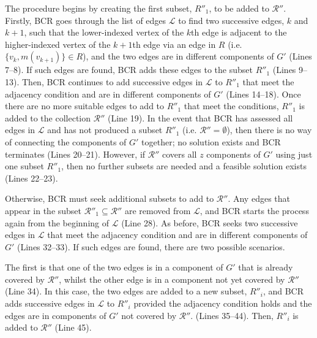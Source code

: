 \documentclass[a4paper,11pt]{article}
\begin{document}
The procedure begins by creating the first subset, $R''_1$, to be added to $\mathcal{R}''$. Firstly, BCR goes through the list of edges $\mathcal{L}$ to find two successive edges, $k$ and $k+1$, such that the lower-indexed vertex of the $k$th edge is adjacent to the higher-indexed vertex of the $k+1$th edge via an edge in $R$ (i.e. $\{v_k, m(v_{k+1})\} \in R$), and the two edges are in different components of $G'$ (Lines 7--8). If such edges are found, BCR adds these edges to the subset $R''_1$ (Lines 9--13). Then, BCR continues to add successive edges in $\mathcal{L}$ to $R''_1$ that meet the adjacency condition and are in different components of $G'$ (Lines 14--18). Once there are no more suitable edges to add to $R''_1$ that meet the conditions, $R''_1$ is added to the collection $\mathcal{R}''$ (Line 19). In the event that BCR has assessed all edges in $\mathcal{L}$ and has not produced a subset $R''_1$ (i.e. $\mathcal{R}'' = \emptyset$), then there is no way of connecting the components of $G'$ together; no solution exists and BCR terminates (Lines 20--21). However, if $\mathcal{R}''$ covers all $z$ components of $G'$ using just one subset $R''_1$, then no further subsets are needed and a feasible solution exists (Lines 22--23).

Otherwise, BCR must seek additional subsets to add to $\mathcal{R}''$. Any edges that appear in the subset $\mathcal{R}''_1 \subseteq \mathcal{R}''$ are removed from $\mathcal{L}$, and BCR starts the process again from the beginning of $\mathcal{L}$ (Line 28). As before, BCR seeks two successive edges in $\mathcal{L}$ that meet the adjacency condition and are in different components of $G'$ (Lines 32--33). If such edges are found, there are two possible scenarios.

The first is that one of the two edges is in a component of $G'$ that is already covered by $\mathcal{R}''$, whilst the other edge is in a component not yet covered by $\mathcal{R}''$ (Line 34). In this case, the two edges are added to a new subset, $R''_i$, and BCR adds successive edges in $\mathcal{L}$ to $R''_i$ provided the adjacency condition holds and the edges are in components of $G'$ not covered by $\mathcal{R}''$. (Lines 35--44). Then, $R''_i$ is added to $\mathcal{R}''$ (Line 45). 
\end{document}
